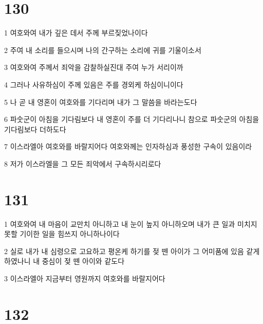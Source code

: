 \chapter{130}

\par 1 여호와여 내가 깊은 데서 주께 부르짖었나이다
\par 2 주여 내 소리를 들으시며 나의 간구하는 소리에 귀를 기울이소서
\par 3 여호와여 주께서 죄악을 감찰하실진대 주여 누가 서리이까
\par 4 그러나 사유하심이 주께 있음은 주를 경외케 하심이니이다
\par 5 나 곧 내 영혼이 여호와를 기다리며 내가 그 말씀을 바라는도다
\par 6 파숫군이 아침을 기다림보다 내 영혼이 주를 더 기다리나니 참으로 파숫군의 아침을 기다림보다 더하도다
\par 7 이스라엘아 여호와를 바랄지어다 여호와께는 인자하심과 풍성한 구속이 있음이라
\par 8 저가 이스라엘을 그 모든 죄악에서 구속하시리로다

\chapter{131}

\par 1 여호와여 내 마음이 교만치 아니하고 내 눈이 높지 아니하오며 내가 큰 일과 미치지 못할 기이한 일을 힘쓰지 아니하나이다
\par 2 실로 내가 내 심령으로 고요하고 평온케 하기를 젖 뗀 아이가 그 어미품에 있음 같게 하였나니 내 중심이 젖 뗀 아이와 같도다
\par 3 이스라엘아 지금부터 영원까지 여호와를 바랄지어다

\chapter{132}

